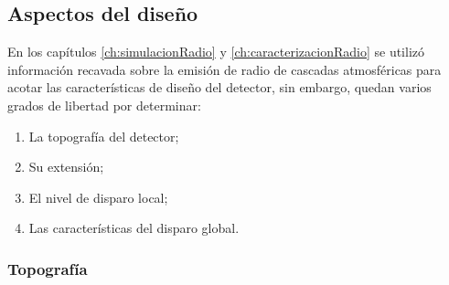 	\subsection{Aspectos del dise\~no}
	
	En los cap\'itulos \ref{ch:simulacionRadio} y \ref{ch:caracterizacionRadio} se utiliz\'o informaci\'on recavada sobre la emisi\'on de radio de cascadas atmosf\'ericas para acotar las caracter\'isticas de dise\~no del detector, sin embargo, quedan varios grados de libertad por determinar:
	\begin{enumerate}
	 \item La topograf\'ia del detector;
	 \item Su extensi\'on;
	 \item El nivel de disparo local;
	 \item Las caracter\'isticas del disparo global.
	\end{enumerate}
	
	
	
	\subsubsection{Topograf\'ia}
	
